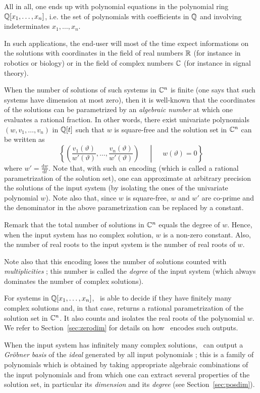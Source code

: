 \documentclass[a4paper,english,11pt]{scrartcl}
\theoremstyle{definition}
\theoremstyle{remark}
\newcommand{\ud}{\mathrm{d}}
\newcommand{\st}{\ \middle|\ }
\begin{document}
All in all, one ends up with polynomial equations in the polynomial ring
$\mathbb{Q}[x_1, \ldots, x_n]$, i.e. the set of polynomials with coefficients in $\mathbb{Q}$
and involving indeterminates $x_1, \ldots, x_n$.

In such applications, the end-user will most of the time expect informations on
the solutions with coordinates in the field of real numbers $\mathbb{R}$ (for instance
in robotics or biology) or in the field of complex numbers $\mathbb{C}$ (for instance in
signal theory).

When the number of solutions of such systems in $\mathbb{C}^n$ is finite (one says that
such systems have dimension at most zero), then it is well-known that the
coordinates of the solutions can be parametrized by an \emph{algebraic number}
at which one evaluates a rational fraction. In other words, there exist
univariate polynomials $(w, v_1, \ldots, v_n)$ in $\mathbb{Q}[t]$ such that $w$ is
square-free and the solution set in $\mathbb{C}^n$ can be written as
\[
  \left \{
  \left (\frac{v_1(\vartheta)}{w'(\vartheta)}, \ldots,
  \frac{v_n(\vartheta)}{w'(\vartheta)}\right ) \quad \st \quad w(\vartheta) = 0
\right \}
\]
where
$w'=\frac{\ud w}{\ud t}$.
Note that, with such an encoding
(which is called a rational parametrization of the solution set), one can
approximate at arbitrary precision the solutions of the input system (by isolating
the ones of the univariate polynomial $w$).
Note also that, since $w$ is square-free, $w$ and $w'$ are co-prime and the
denominator in the above parametrization can be replaced by a constant.

Remark that the total number of solutions in $\mathbb{C}^n$ equals the degree of $w$.
Hence, when the input system has no complex solution, $w$ is a non-zero
constant. Also, the number of real roots to the input system is the number of
real roots of $w$.

Note also that this encoding loses the number of solutions counted with
\emph{multiplicities} ; this number is called the \emph{degree} of the input
system (which always dominates the number of complex solutions). 

For systems in $\mathbb{Q}[x_1, \ldots, x_n]$, \msolve~is able to decide if they have
finitely many complex solutions and, in that case, returns a rational
parametrization of the solution set in $\mathbb{C}^n$. It also counts and isolates the
real roots of the polynomial $w$. We refer to Section~\ref{sec:zerodim} for
details on how \msolve~encodes such outputs.

When the input system has infinitely many complex solutions, \msolve~can output
a \emph{Gr\"obner basis} of the \emph{ideal} generated by all input polynomials
; this is a family of polynomials which is obtained by taking appropriate
algebraic combinations of the input polynomials and from which one can extract
several properties of the solution set, in particular its \emph{dimension} and
its \emph{degree} (see Section~\ref{sec:posdim}). 
\end{document}
